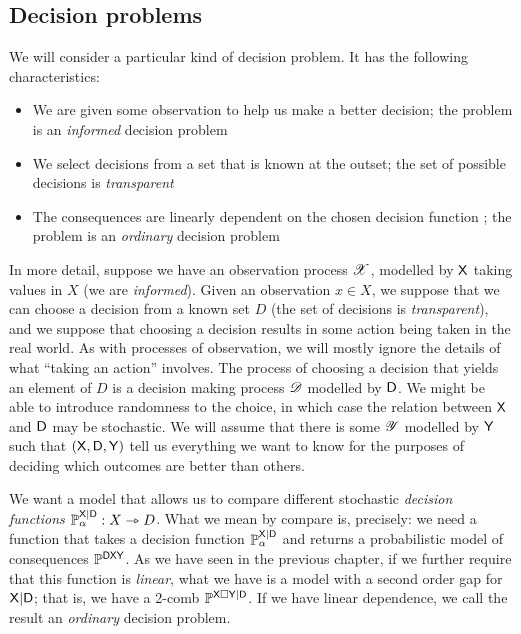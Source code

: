 \subsection{Decision problems}

We will consider a particular kind of decision problem. It has the following characteristics:
\begin{itemize}
    \item We are given some observation to help us make a better decision; the problem is an \emph{informed} decision problem
    \item We select decisions from a set that is known at the outset; the set of possible decisions is \emph{transparent}
    \item The consequences are linearly dependent on the chosen decision function ; the problem is an \emph{ordinary} decision problem
\end{itemize}

In more detail, suppose we have an observation process $\mathscr{X}$, modelled by $\mathsf{X}$ taking values in $X$ (we are \emph{informed}). Given an observation $x\in X$, we suppose that we can choose a decision from a known set $D$ (the set of decisions is \emph{transparent}), and we suppose that choosing a decision results in some action being taken in the real world. As with processes of observation, we will mostly ignore the details of what ``taking an action'' involves. The process of choosing a decision that yields an element of $D$ is a decision making process $\mathscr{D}$ modelled by $\mathsf{D}$. We might be able to introduce randomness to the choice, in which case the relation between $\mathsf{X}$ and $\mathsf{D}$ may be stochastic.  We will assume that there is some $\mathscr{Y}$ modelled by $\mathsf{Y}$ such that $(\mathsf{X},\mathsf{D},\mathsf{Y})$ tell us everything we want to know for the purposes of deciding which outcomes are better than others.

We want a model that allows us to compare different stochastic \emph{decision functions} $\mathbb{P}^{\mathsf{X}|\mathsf{D}}_\alpha:X\rightarrowtriangle D$. What we mean by compare is, precisely: we need a function that takes a decision function $\mathbb{P}^{\mathsf{X}|\mathsf{D}}_\alpha$ and returns a probabilistic model of consequences $\mathbb{P}^{\mathsf{DXY}}$. As we have seen in the previous chapter, if we further require that this function is \emph{linear}, what we have is a model with a second order gap for $\mathsf{X}|\mathsf{D}$; that is, we have a 2-comb $\mathbb{P}^{\mathsf{X}\square \mathsf{Y}|\mathsf{D}}$. If we have linear dependence, we call the result an \emph{ordinary} decision problem.

